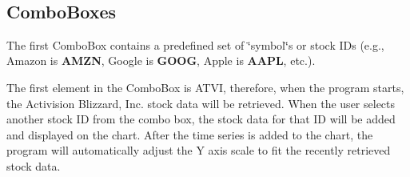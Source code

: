  ~\newline
\hypertarget{index_comboboxes}{}\subsection{Combo\+Boxes}\label{index_comboboxes}
The first Combo\+Box contains a predefined set of \char`\"{}symbol\char`\"{}s or stock I\+Ds (e.\+g., Amazon is {\bfseries A\+M\+ZN}, Google is {\bfseries G\+O\+OG}, Apple is {\bfseries A\+A\+PL}, etc.).

The first element in the Combo\+Box is A\+T\+VI, therefore, when the program starts, the Activision Blizzard, Inc. stock data will be retrieved. When the user selects another stock ID from the combo box, the stock data for that ID will be added and displayed on the chart. After the time series is added to the chart, the program will automatically adjust the Y axis scale to fit the recently retrieved stock data.


